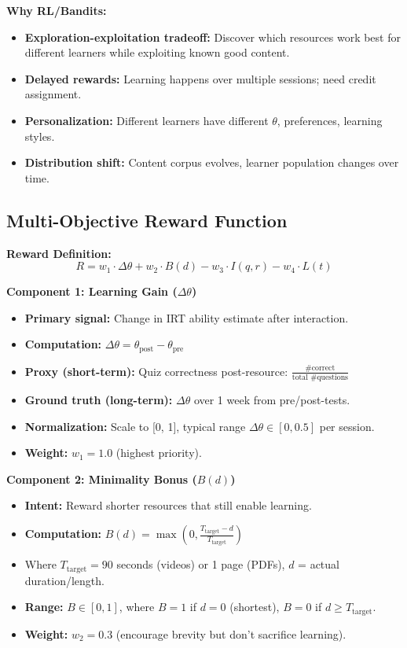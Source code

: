 \documentclass[11pt,letterpaper]{article}
\begin{document}
\textbf{Why RL/Bandits:}
\begin{itemize}
\item \textbf{Exploration-exploitation tradeoff:} Discover which resources work best for different learners while exploiting known good content.
\item \textbf{Delayed rewards:} Learning happens over multiple sessions; need credit assignment.
\item \textbf{Personalization:} Different learners have different $\theta$, preferences, learning styles.
\item \textbf{Distribution shift:} Content corpus evolves, learner population changes over time.
\end{itemize}

\subsection{Multi-Objective Reward Function}\label{subsec:multi-objective-reward}

\textbf{Reward Definition:}
\[
R = w_1 \cdot \Delta\theta + w_2 \cdot B(d) - w_3 \cdot I(q, r) - w_4 \cdot L(t)
\]

\textbf{Component 1: Learning Gain ($\Delta\theta$)}
\begin{itemize}
\item \textbf{Primary signal:} Change in IRT ability estimate after interaction.
\item \textbf{Computation:} $\Delta\theta = \theta_{\text{post}} - \theta_{\text{pre}}$
\item \textbf{Proxy (short-term):} Quiz correctness post-resource: $\frac{\text{\# correct}}{\text{total \# questions}}$
\item \textbf{Ground truth (long-term):} $\Delta\theta$ over 1 week from pre/post-tests.
\item \textbf{Normalization:} Scale to [0, 1], typical range $\Delta\theta \in [0, 0.5]$ per session.
\item \textbf{Weight:} $w_1 = 1.0$ (highest priority).
\end{itemize}

\textbf{Component 2: Minimality Bonus ($B(d)$)}
\begin{itemize}
\item \textbf{Intent:} Reward shorter resources that still enable learning.
\item \textbf{Computation:} $B(d) = \max\left(0, \frac{T_{\text{target}} - d}{T_{\text{target}}}\right)$
\item Where $T_{\text{target}} = 90$ seconds (videos) or 1 page (PDFs), $d$ = actual duration/length.
\item \textbf{Range:} $B \in [0, 1]$, where $B=1$ if $d=0$ (shortest), $B=0$ if $d \geq T_{\text{target}}$.
\item \textbf{Weight:} $w_2 = 0.3$ (encourage brevity but don't sacrifice learning).
\end{itemize}
\end{document}
